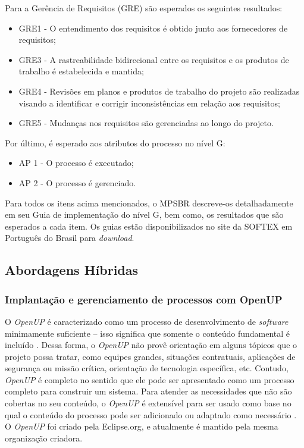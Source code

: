 \documentclass{acm_proc_article-sp}
\begin{document}
Para a Gerência de Requisitos (GRE) são esperados os seguintes resultados:
\begin{itemize}
\item GRE1 - O entendimento dos requisitos é obtido junto aos fornecedores de requisitos;
\item GRE3 - A rastreabilidade bidirecional entre os requisitos e os produtos de trabalho é estabelecida e mantida;
\item GRE4 - Revisões em planos e produtos de trabalho do projeto são realizadas visando a identificar e corrigir inconsistências em relação aos requisitos;
\item GRE5 - Mudanças nos requisitos são gerenciadas ao longo do projeto.
\end{itemize}

Por último, é esperado aos atributos do processo no nível G:
\begin{itemize}
\item AP 1 - O processo é executado;
\item AP 2 - O processo é gerenciado.
\end{itemize}

Para todos os itens acima mencionados, o MPSBR \cite{mpsbr:nAgil} descreve-os detalhadamente em seu Guia de implementação do nível G, bem como, os resultados que são esperados a cada item. Os guias estão disponibilizados no site da SOFTEX em Português do Brasil para \textit{download}.


\subsection{Abordagens Híbridas}

\subsubsection{Implantação e gerenciamento de processos com OpenUP}
O \textit{OpenUP} é caracterizado como um processo de desenvolvimento de \textit{software} minimamente suficiente – isso
significa que somente o conteúdo fundamental é incluído \cite{openUP:agil}. Dessa forma, o \textit{OpenUP} não provê orientação em
alguns tópicos que o projeto possa tratar, como equipes grandes, situações contratuais, aplicações de segurança ou missão crítica, orientação de tecnologia específica, etc. Contudo, \textit{OpenUP} é completo no sentido que ele pode ser apresentado como um processo completo para construir um sistema. Para atender as necessidades que não são cobertas no seu conteúdo, o \textit{OpenUP} é extensível para ser usado como base no qual o conteúdo do processo pode ser adicionado ou adaptado como necessário \cite{openUP:agil}. O \textit{OpenUP} foi criado pela Eclipse.org, e atualmente é mantido pela mesma organização criadora.
\end{document}
